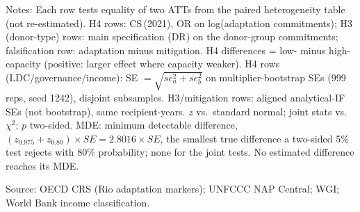 \begin{table}[H]
\centering
\caption{Formal tests of differences in the NAP effect across subgroups, donor types and outcomes (H3, H4)}
\label{tab:het_difftests}
\begingroup\small
{}
\endgroup
\par\vspace{4pt}
\begin{minipage}{\linewidth}\footnotesize
Notes: Each row tests equality of two ATTs from the paired heterogeneity table (not re-estimated). H4 rows: CS\,(2021), OR on log(adaptation commitments); H3 (donor-type) rows: main specification (DR) on the donor-group commitments; falsification row: adaptation minus mitigation. H4 differences = low- minus high-capacity (positive: larger effect where capacity weaker). H4 rows (LDC/governance/income): SE $=\sqrt{se_a^2+se_b^2}$ on multiplier-bootstrap SEs (999 reps, seed 1242), disjoint subsamples. H3/mitigation rows: aligned analytical-IF SEs (not bootstrap), same recipient-years. $z$ vs.\ standard normal; joint stats vs.\ $\chi^2$; $p$ two-sided. MDE: minimum detectable difference, $(z_{0.975}+z_{0.80}) \times SE = 2.8016 \times SE$, the smallest true difference a two-sided 5\% test rejects with 80\% probability; none for the joint tests. No estimated difference reaches its MDE.\par
Source: OECD CRS (Rio adaptation markers); UNFCCC NAP Central; WGI; World Bank income classification.
\end{minipage}
\end{table}
